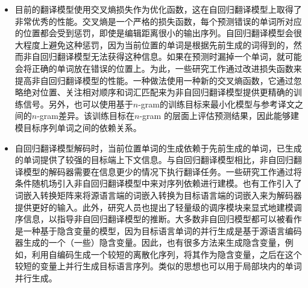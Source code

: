 \begin{itemize}
\vspace{0.5em}
\item 目前的翻译模型使用交叉熵损失作为优化函数，这在自回归翻译模型上取得了非常优秀的性能。交叉熵是一个严格的损失函数，每个预测错误的单词所对应的位置都会受到惩罚，即使是编辑距离很小的输出序列。自回归翻译模型会很大程度上避免这种惩罚，因为当前位置的单词是根据先前生成的词得到的，然而非自回归翻译模型无法获得这种信息。如果在预测时漏掉一个单词，就可能会将正确的单词放在错误的位置上。为此，一些研究工作通过改进损失函数来提高非自回归翻译模型的性能。一种做法使用一种新的交叉熵函数，它通过忽略绝对位置、关注相对顺序和词汇匹配来为非自回归翻译模型提供更精确的训练信号。另外，也可以使用基于$n$-gram的训练目标来最小化模型与参考译文之间的$n$-gram差异。该训练目标在$n$-gram 的层面上评估预测结果，因此能够建模目标序列单词之间的依赖关系。
\vspace{0.5em}
\item 自回归翻译模型解码时，当前位置单词的生成依赖于先前生成的单词，已生成的单词提供了较强的目标端上下文信息。与自回归翻译模型相比，非自回归翻译模型的解码器需要在信息更少的情况下执行翻译任务。一些研究工作通过将条件随机场引入非自回归翻译模型中来对序列依赖进行建模。也有工作引入了词嵌入转换矩阵来将源语言端的词嵌入转换为目标语言端的词嵌入来为解码器提供更好的输入。此外，研究人员也提出了轻量级的调序模块来显式地建模调序信息，以指导非自回归翻译模型的推断。大多数非自回归模型都可以被看作是一种基于隐含变量的模型，因为目标语言单词的并行生成是基于源语言编码器生成的一个（一些）隐含变量。因此，也有很多方法来生成隐含变量，例如，利用自编码生成一个较短的离散化序列，将其作为隐含变量，之后在这个较短的变量上并行生成目标语言序列。类似的思想也可以用于局部块内的单词并行生成。
\vspace{0.5em}
\end{itemize}








